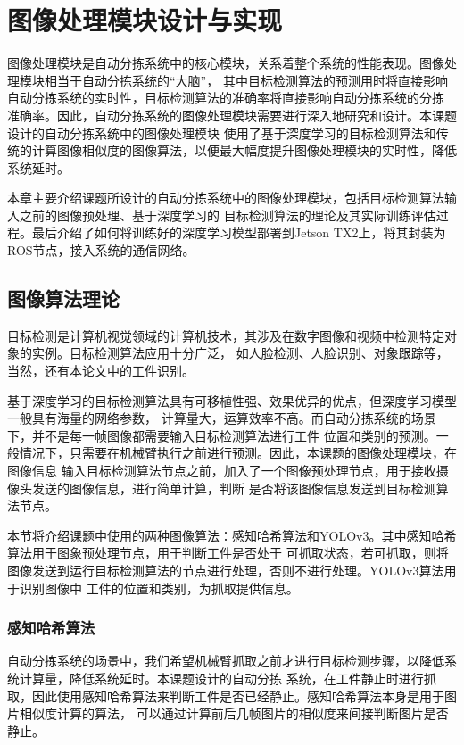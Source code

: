 \chapter{图像处理模块设计与实现}
图像处理模块是自动分拣系统中的核心模块，关系着整个系统的性能表现。图像处理模块相当于自动分拣系统的“大脑”，
其中目标检测算法的预测用时将直接影响自动分拣系统的实时性，目标检测算法的准确率将直接影响自动分拣系统的分拣
准确率。因此，自动分拣系统的图像处理模块需要进行深入地研究和设计。本课题设计的自动分拣系统中的图像处理模块
使用了基于深度学习的目标检测算法和传统的计算图像相似度的图像算法，以便最大幅度提升图像处理模块的实时性，降低
系统延时。

本章主要介绍课题所设计的自动分拣系统中的图像处理模块，包括目标检测算法输入之前的图像预处理、基于深度学习的
目标检测算法的理论及其实际训练评估过程。最后介绍了如何将训练好的深度学习模型部署到Jetson TX2上，将其封装为
ROS节点，接入系统的通信网络。

\section{图像算法理论}
目标检测是计算机视觉领域的计算机技术，其涉及在数字图像和视频中检测特定对象的实例。目标检测算法应用十分广泛，
如人脸检测、人脸识别、对象跟踪等，当然，还有本论文中的工件识别。

基于深度学习的目标检测算法具有可移植性强、效果优异的优点，但深度学习模型一般具有海量的网络参数，
计算量大，运算效率不高。而自动分拣系统的场景下，并不是每一帧图像都需要输入目标检测算法进行工件
位置和类别的预测。一般情况下，只需要在机械臂执行之前进行预测。因此，本课题的图像处理模块，在图像信息
输入目标检测算法节点之前，加入了一个图像预处理节点，用于接收摄像头发送的图像信息，进行简单计算，判断
是否将该图像信息发送到目标检测算法节点。

本节将介绍课题中使用的两种图像算法：感知哈希算法\cite{ganzhihash}和YOLOv3。其中感知哈希算法用于图象预处理节点，用于判断工件是否处于
可抓取状态，若可抓取，则将图像发送到运行目标检测算法的节点进行处理，否则不进行处理。YOLOv3算法用于识别图像中
工件的位置和类别，为抓取提供信息。

\subsection{感知哈希算法}

自动分拣系统的场景中，我们希望机械臂抓取之前才进行目标检测步骤，以降低系统计算量，降低系统延时。本课题设计的自动分拣
系统，在工件静止时进行抓取，因此使用感知哈希算法来判断工件是否已经静止。感知哈希算法本身是用于图片相似度计算的算法，
可以通过计算前后几帧图片的相似度来间接判断图片是否静止。

